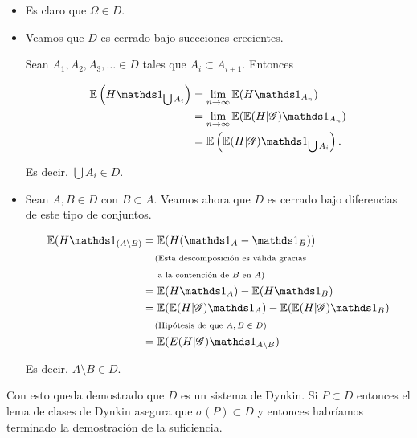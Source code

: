\begin{itemize}
	\item 
        Es claro que $\Omega \in D$.

    \item
        Veamos que $D$ es cerrado bajo suceciones crecientes.\par\null

        Sean $A_1, A_2, A_3, \dots \in D$ tales que $A_i \subset A_{i+1}$. Entonces

        \begin{align}
         \E\paren{H \indic_{\bigcup A_i}}  &=  \lim_{n \rightarrow \infty}    \E(H \indic_{A_n})             \\
                                        &=  \lim_{n \rightarrow \infty}    \E(\E( H | \G) \indic_{A_n})   \\
                                        &=  \E\paren{\E( H | \G) \indic_{\bigcup A_i}}.
        \end{align}

        Es decir, $\bigcup A_i \in D$.

    \item
        Sean $A, B \in D$ con $B \subset A$. Veamos ahora que $D$ es cerrado bajo diferencias de este tipo de conjuntos. 

        \begin{align}
                \E(H \indic_{(A \setminus B)}   &=  \E(H (\indic_A - \indic_B))                                                 \\
                                                &\lcomment{Esta descomposición es válida gracias}                               \\
                                                &\rcomment{ a la contención de $B$ en $A$}                                      \\
                                                &=  \E(H \indic_A) - \E(H \indic_B)                                             \\
                                                &=  \E(\E(H | \G) \indic_A) - \E(\E(H | \G) \indic_B)                           \\
                                                &\comment{Hipótesis de que $A, B \in D$}                                        \\
                                                &=  \E(E(H | \G) \indic_{A \setminus B})
        \end{align}

        Es decir, $A \setminus B \in D$.
\end{itemize}

Con esto queda demostrado que $D$ es un sistema de Dynkin. Si $P \subset D$ entonces el lema de clases de Dynkin asegura que
$\sigma(P) \subset D$ y entonces habríamos terminado la demostración de la suficiencia.

